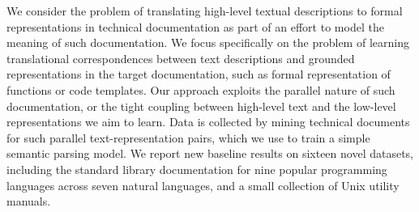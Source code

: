 We consider the problem of translating high-level textual descriptions to formal representations in technical documentation as part of an effort to model the meaning of such documentation.  We focus specifically on the problem of learning translational correspondences between text descriptions and grounded representations in the target documentation, such as formal representation of functions or code templates.  Our approach exploits the parallel nature of such documentation, or the tight coupling between high-level text and the low-level representations we aim to learn. Data is collected by mining technical documents for such parallel text-representation pairs, which we use to train a simple semantic parsing model. We report new baseline results on sixteen novel datasets, including the standard library documentation for nine popular programming languages across seven natural languages, and a small collection of Unix utility manuals.
